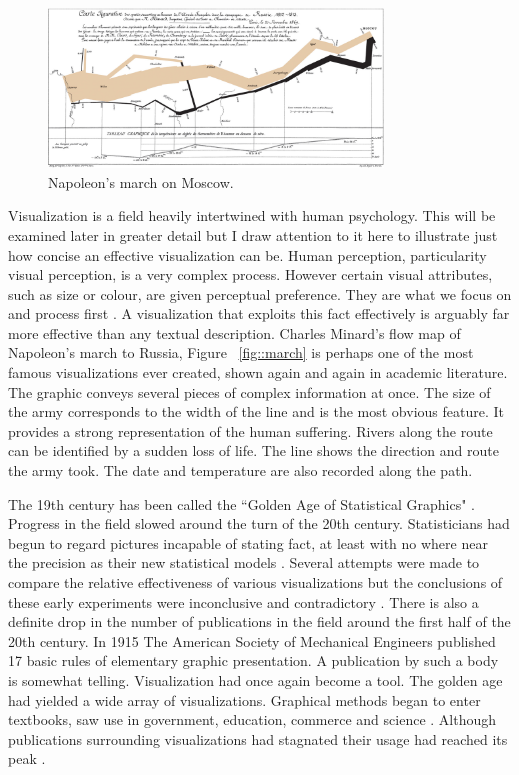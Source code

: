 \documentclass[a4paper, 10pt, titlepage, twocolumn, onehalfspace]{article}
\begin{document}
\begin{figure}[hbt]
  \begin{center}
    \includegraphics[width=3.5in]{Minard.png}
  \end{center}
  \caption{\small Napoleon's march on Moscow.}
  \label{fig:march}
\end{figure}



Visualization is a field heavily intertwined with human psychology. This will be examined later in greater detail but I draw attention to it here to illustrate just how concise an effective visualization can be. Human perception, particularity visual perception, is a very complex process. However certain visual attributes, such as size or colour, are given perceptual preference. They are what we focus on and process first \cite{mackinlay1986automating}. A visualization that exploits this fact effectively is arguably far more effective than any textual description. Charles Minard's flow map of Napoleon's march to Russia, Figure ~\ref{fig::march} is perhaps one of the most famous visualizations ever created, shown again and again in academic literature. The graphic conveys several pieces of complex information at once. The size of the army corresponds to the width of the line and is the most obvious feature. It provides a strong representation of the human suffering. Rivers along the route can be identified by a sudden loss of life. The line shows the direction and route the army took. The date and temperature are also recorded along the path.

The 19th century has been called the ``Golden Age of Statistical Graphics" \cite{friendly2008golden}. Progress in the field slowed around the turn of the 20th century. Statisticians had begun to regard pictures incapable of stating fact, at least with no where near the precision as their new statistical models \cite{friendly2000discussion}. Several attempts were made to compare the relative effectiveness of various visualizations but the conclusions of these early experiments were inconclusive and contradictory \cite{fienberg1979graphical}. There is also a definite drop in the number of publications in the field around the first half of the 20th century. In 1915 The American Society of Mechanical Engineers published 17 basic rules of elementary graphic presentation. A publication by such a body is somewhat telling. Visualization had once again become a tool. The golden age had yielded a wide array of visualizations. Graphical methods began to enter textbooks, saw use in government, education, commerce and science \cite{haskell1919make,ayres1919war,gantt1919organization}. Although publications surrounding visualizations had stagnated their usage had reached its peak \cite{fienberg1979graphical}.
\end{document}
